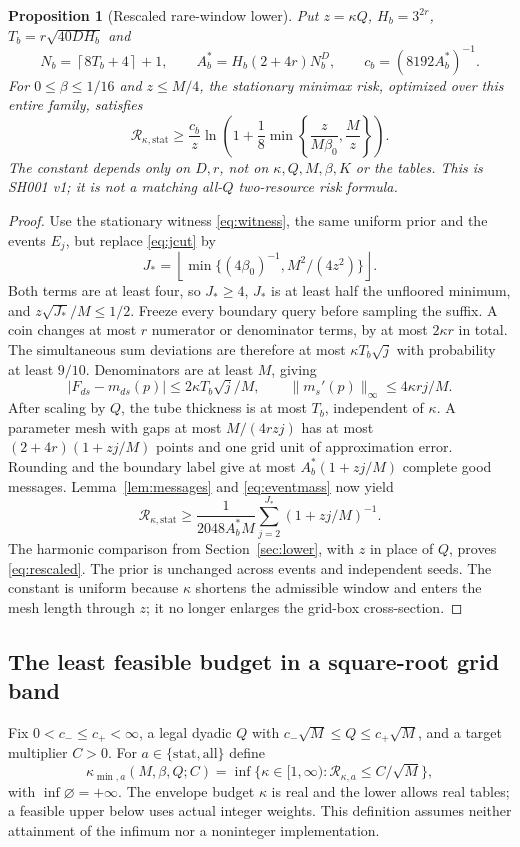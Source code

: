 \documentclass[11pt,letterpaper]{article}
\newtheorem{proposition}[theorem]{Proposition}
\theoremstyle{definition}\newtheorem{definition}[theorem]{Definition}
\theoremstyle{remark}\newtheorem{remark}[theorem]{Remark}
\newcommand{\floor}[1]{\left\lfloor #1\right\rfloor}
\newcommand{\ceil}[1]{\left\lceil #1\right\rceil}
\newcommand{\betaz}{\beta_0}
\newcommand{\Risk}{\mathcal{R}}
\newcommand{\unit}[1]{\textsf{#1}}
\begin{document}
\begin{proposition}[Rescaled rare-window lower]\label{prop:rescaled}
Put $z=\kappa Q$, $H_b=3^{2r}$, $T_b=r\sqrt{40DH_b}$ and
\[
 N_b=\ceil{8T_b+4}+1,\qquad
 A_b^*=H_b(2+4r)N_b^D,\qquad c_b=(8192A_b^*)^{-1}.
\]
For $0\le\beta\le1/16$ and $z\le M/4$, the stationary minimax risk, optimized over this entire family, satisfies
\begin{equation}\label{eq:rescaled}
 \Risk_{\kappa,\mathrm{stat}}\ge
 \frac{c_b}{z}\ln\left(1+\frac18\min\left\{\frac{z}{M\betaz},\frac Mz\right\}\right).
\end{equation}
The constant depends only on $D,r$, not on $\kappa,Q,M,\beta,K$ or the tables. This is \unit{SH001 v1}; it is not a matching all-$Q$ two-resource risk formula.
\end{proposition}
\begin{proof}
Use the stationary witness \eqref{eq:witness}, the same uniform prior and the events $E_j$, but replace \eqref{eq:jcut} by
\[
 J_*=\floor{\min\{(4\betaz)^{-1},M^2/(4z^2)\}}.
\]
Both terms are at least four, so $J_*\ge4$, $J_*$ is at least half the unfloored minimum, and $z\sqrt{J_*}/M\le1/2$. Freeze every boundary query before sampling the suffix. A coin changes at most $r$ numerator or denominator terms, by at most $2\kappa r$ in total. The simultaneous sum deviations are therefore at most $\kappa T_b\sqrt j$ with probability at least $9/10$. Denominators are at least $M$, giving
\[
 |F_{ds}-m_{ds}(p)|\le2\kappa T_b\sqrt j/M,\qquad
 \|m_s'(p)\|_\infty\le4\kappa rj/M.
\]
After scaling by $Q$, the tube thickness is at most $T_b$, independent of $\kappa$. A parameter mesh with gaps at most $M/(4rzj)$ has at most $(2+4r)(1+zj/M)$ points and one grid unit of approximation error. Rounding and the boundary label give at most $A_b^*(1+zj/M)$ complete good messages. Lemma~\ref{lem:messages} and \eqref{eq:eventmass} now yield
\[
 \Risk_{\kappa,\mathrm{stat}}\ge
 \frac1{2048A_b^*M}\sum_{j=2}^{J_*}(1+zj/M)^{-1}.
\]
The harmonic comparison from Section~\ref{sec:lower}, with $z$ in place of $Q$, proves \eqref{eq:rescaled}. The prior is unchanged across events and independent seeds. The constant is uniform because $\kappa$ shortens the admissible window and enters the mesh length through $z$; it no longer enlarges the grid-box cross-section.
\end{proof}

\subsection{The least feasible budget in a square-root grid band}
Fix $0<c_-\le c_+<\infty$, a legal dyadic $Q$ with $c_-\sqrt M\le Q\le c_+\sqrt M$, and a target multiplier $C>0$. For $a\in\{\mathrm{stat},\mathrm{all}\}$ define
\begin{equation}\label{eq:kappamin}
 \kappa_{\min,a}(M,\beta,Q;C)
 =\inf\{\kappa\in[1,\infty):\Risk_{\kappa,a}\le C/\sqrt M\},
\end{equation}
with $\inf\varnothing=+\infty$. The envelope budget $\kappa$ is real and the lower allows real tables; a feasible upper below uses actual integer weights. This definition assumes neither attainment of the infimum nor a noninteger implementation.
\end{document}

